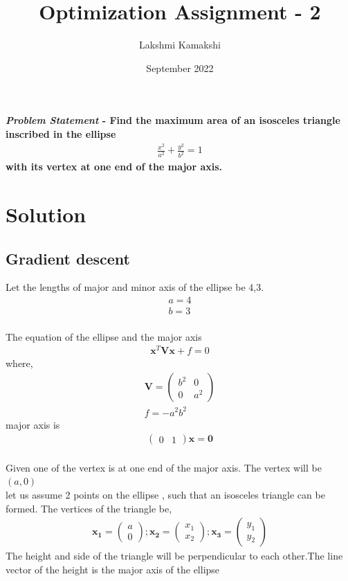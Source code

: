 \documentclass[journal,10pt,twocolumn]{article}
\title{\textbf{Optimization Assignment - 2}}
\author{Lakshmi Kamakshi}
\date{September 2022}
\let\vec\mathbf
\newcommand{\myvec}[1]{\ensuremath{\begin{pmatrix}#1\end{pmatrix}}}
\begin{document}
\maketitle
\paragraph{\textit{Problem Statement} - Find the maximum area of an isosceles triangle inscribed in the ellipse \begin{align} \frac{x^2}{a^2}+ \frac{y^2}{b^2} = 1 \end{align}  with its vertex at one end of the major axis.} 

\section*{\large Solution}
\subsection*{\normalsize Gradient descent}
Let the lengths of major and minor axis of the ellipse be 4,3.
\begin{align}
	a = 4
	\\b=3
\end{align}
\\The equation of the ellipse and the major axis 
\begin{align}
	\vec{x}^T\vec{V}\vec{x} + f = 0 
	\label{eq:ellipse}	
\end{align}
where,
\begin{align}
	\vec{V} = \myvec{b^2&0\\0&a^2}
	\\f = -a^2b^2
\end{align}
major axis is
	\begin{align}
		\myvec{0&1}\vec{x} = \vec{0}
	\end{align}
\\Given one of the vertex is at one end of the major axis. The vertex will be $(a,0)$
\\let us assume 2 points on the ellipse , such that an isosceles triangle can be formed. The vertices of the triangle be,
\begin{align}
	\vec{x_1} = \myvec{a \\ 0} ;
	\vec{x_2} = \myvec{x_1 \\ x_2} ;
	\vec{x_3} = \myvec{y_1 \\ y_2} 
\end{align}
The height and side of the triangle  will be perpendicular to each other.The line vector of the height is the major axis of the ellipse
\end{document}
